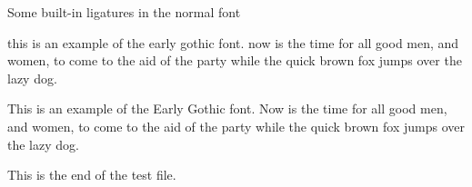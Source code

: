 \documentclass{article}
\newcommand{\sentence}{%
this is an example of the early gothic font. now is the time for all good
men, and women, to come to the aid of the party while the quick brown fox
jumps over the lazy dog.}
\newcommand{\Sentence}{%
This is an example of the Early Gothic font. Now is the time for all good
men, and women, to come to the aid of the party while the quick brown fox
jumps over the lazy dog.}
\newcommand{\esses}{sa sb sc sd se sf sg sh si sj sk sl sm 
                    sn so sp sq sr ss st su sv sw sx sy sz}
\newcommand{\exes}{xa xb xc xd xe xf xg xh xi xj xk xl xm 
                  xn xo xp xq xr xs xt xu xv xw xx xy xz}
\newcommand{\jays}{aj bj cj dj ej fj gj hj ij jj kj lj mj 
                   nj oj pj qj rj sj tj uj vj wj xj yj zj}
\newcommand{\dees}{ad bd cd dd ed fd gd hd id jd kd ld md 
                   nd od pd qd rd sd td ud vd wd xd yd zd}
\newcommand{\ares}{ra rb rc rd re rf rg rh ri rj rk rl rm 
                   rn ro rp rq rr rs rt ru rv rw rx ry rz}
\newcommand{\Esses}{SA SB SC SD SE SF SG SH SI SJ SK SL SM 
                    SN SO SP SQ SR SS ST SU SV SW SX SY SZ}
\newcommand{\Exes}{XA XB XC XD XE XF XG XH XI XJ XK XL XM 
                  XN XO XP XQ XR XS XT XU XV XW XX XY XZ}
\newcommand{\Jays}{AJ BJ CJ DJ EJ FJ GJ HJ IJ JJ KJ LJ MJ 
                   NJ OJ PJ QJ RJ SJ TJ UJ VJ WJ XJ YJ ZJ}
\newcommand{\Dees}{AD BD CD DD ED FD GD HD ID JD KD LD MD 
                   ND OD PD QD RD SD TD UD VD WD XD YD ZD}
\newcommand{\Ares}{RA RB RC RD RE RF RG RH RI RJ RK RL RM 
                   RN RO RP RQ RR RS RT RU RV RW RX RY RZ}
\begin{document}
\begin{center}
    Some built-in ligatures in the normal font \\
\end{center}


{
\egothfamily 
\sentence{}

\Sentence{}
}
    
    This is the end of the test file.
\end{document}
